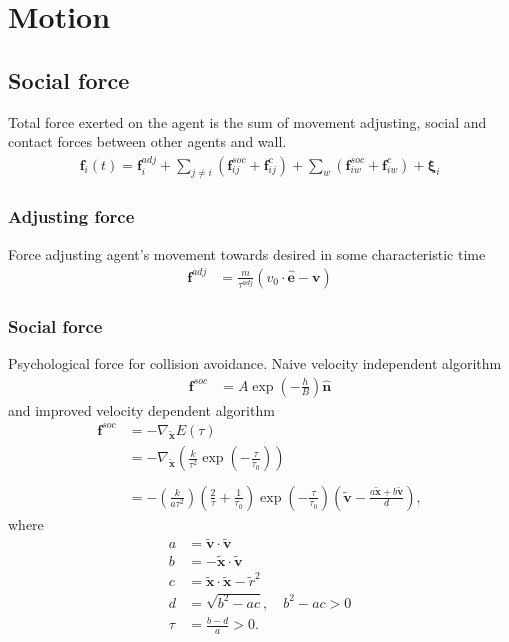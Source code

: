 \section{Motion}
\subsection{Social force}
Total force exerted on the agent is the sum of movement adjusting, social and contact forces between other agents and wall.
\begin{align}
\mathbf{f}_{i}(t) = \mathbf{f}_{i}^{adj} + \sum_{j\neq i}^{} \left(\mathbf{f}_{ij}^{soc} + \mathbf{f}_{ij}^{c}\right) + \sum_{w}^{} \left(\mathbf{f}_{iw}^{soc} + \mathbf{f}_{iw}^{c}\right) + \boldsymbol{\xi}_{i}
\end{align}


\subsubsection{Adjusting force}
Force adjusting agent's movement towards desired in some characteristic time \begin{align}
\mathbf{f}^{adj} &= \frac{m}{\tau^{adj}} (v_{0} \cdot \hat{\mathbf{e}} - \mathbf{v}) 
\end{align}


\subsubsection{Social force}
Psychological force for collision avoidance. Naive velocity independent algorithm
\begin{align}
\mathbf{f}^{soc} &= A \exp\left(-\frac{h}{B}\right) \hat{\mathbf{n}}
\end{align}
and improved velocity dependent algorithm
\begin{align}
\mathbf{f}^{soc} &= -\nabla_{\tilde{\mathbf{x}}} E(\tau)  \\
&= -\nabla_{\tilde{\mathbf{x}}} \left(\frac{k}{\tau^{2}} \exp \left( -\frac{\tau}{\tau_{0}} \right) \right) \\
\\
&= - \left(\frac{k}{a \tau^{2}}\right) 
\left(\frac{2}{\tau} + \frac{1}{\tau_{0}}\right) 
\exp\left (-\frac{\tau}{\tau_{0}}\right )
\left(\tilde{\mathbf{v}} -\frac{a \tilde{\mathbf{x}} + b \tilde{\mathbf{v}}}{d} \right),
\end{align}
where
\begin{align}
a &= \tilde{\mathbf{v}} \cdot \tilde{\mathbf{v}} \\
b &= -\tilde{\mathbf{x}} \cdot \tilde{\mathbf{v}} \\
c &= \tilde{\mathbf{x}} \cdot \tilde{\mathbf{x}} - \tilde{r}^{2} \\
d &= \sqrt{b^{2} - a c}, \quad b^{2} - a c > 0 \\
\tau &= \frac{b - d}{a} > 0.
\end{align}


